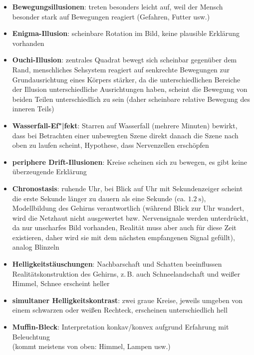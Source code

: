 \linie
\begin{itemize}
    \item
    \textbf{Bewegungsillusionen}:
    treten besonders leicht auf, weil der Mensch besonder stark auf
    Bewegungen reagiert (Gefahren, Futter usw.)
    
    \item
    \textbf{Enigma-Illusion}:
    scheinbare Rotation im Bild,
    keine plausible Erklärung vorhanden
    
    \item
    \textbf{Ouchi-Illusion}:
    zentrales Quadrat bewegt sich scheinbar gegenüber dem Rand,
    menschliches Sehsystem reagiert auf senkrechte Bewegungen zur
    Grundausrichtung eines Körpers stärker, da die unterschiedlichen
    Bereiche der Illusion unterschiedliche Ausrichtungen haben,
    scheint die Bewegung von beiden Teilen unterschiedlich zu sein
    (daher scheinbare relative Bewegung des inneren Teils)
    
    \item
    \textbf{Wasserfall-Ef"|fekt}:
    Starren auf Wasserfall (mehrere Minuten) bewirkt, dass bei Betrachten
    einer unbewegten Szene direkt danach die Szene nach oben zu laufen scheint,
    Hypothese, dass Nervenzellen erschöpfen
    
    \item
    \textbf{periphere Drift-Illusionen}:
    Kreise scheinen sich zu bewegen, es gibt keine überzeugende Erklärung
    
    \item
    \textbf{Chronostasis}:
    ruhende Uhr, bei Blick auf Uhr mit Sekundenzeiger scheint die erste
    Sekunde länger zu dauern als eine Sekunde (ca. $\SI{1.2}{\second}$),
    Modellbildung des Gehirns verantwortlich
    (während Blick zur Uhr wandert, wird die Netzhaut nicht ausgewertet bzw.
    Nervensignale werden unterdrückt, da nur unscharfes Bild vorhanden,
    Realität muss aber auch für diese Zeit existieren, daher wird sie
    mit dem nächsten empfangenen Signal gefüllt),
    analog Blinzeln
\end{itemize}
\linie
\pagebreak
\begin{itemize}
    \item
    \textbf{Helligkeitstäuschungen}:
    Nachbarschaft und Schatten beeinflussen Realitätskonstruktion des Gehirns,
    z.\,B. auch Schneelandschaft und weißer Himmel,
    Schnee erscheint heller
    
    \item
    \textbf{simultaner Helligkeitskontrast}:
    zwei graue Kreise, jeweils umgeben von einem schwarzen oder weißen
    Rechteck, erscheinen unterschiedlich hell
    
    \item
    \textbf{Muffin-Bleck}:
    Interpretation konkav/konvex aufgrund Erfahrung mit Beleuchtung \\
    (kommt meistens von oben: Himmel, Lampen usw.)
\end{itemize}
